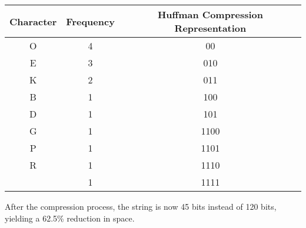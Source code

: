 \documentclass{article}
\begin{document}
	\begin{center}
		\begin{tabular}{| c | c | c |}
			\hline
			Character & Frequency & Huffman Compression Representation\\
			\hline
			O & 4 & 00\\
			E & 3 & 010\\
			K & 2 & 011\\
			B & 1 & 100\\
			D & 1 & 101\\
			G & 1 & 1100\\
			P & 1 & 1101\\
			R & 1 & 1110\\
			  & 1 & 1111\\
			\hline
		\end{tabular}
	\end{center}
\noindent After the compression process, the string is now 45 bits instead of 120 bits, yielding a 62.5\% reduction in space.
\end{document}

